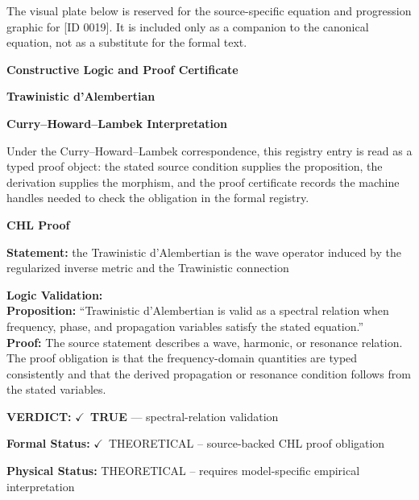 \begingroup\footnotesize\sloppy
The visual plate below is reserved for the source-specific equation and progression graphic for [ID 0019]. It is included only as a companion to the canonical equation, not as a substitute for the formal text.
\par\endgroup
\ifTZPDarkEdition
{}
\fi

\clearpage
\begingroup\tzpsupportsetup
\noindent\textbf{\fontsize{10.8pt}{12.8pt}\selectfont [ID 0019] Constructive Logic and Proof Certificate}\par
\noindent\textbf{\fontsize{10pt}{12pt}\selectfont Trawinistic d'Alembertian}\par
\vspace{0.45em}
\begingroup
\footnotesize
\setlength{\parskip}{0.22em}
\setlength{\parindent}{0pt}
\noindent\textbf{Curry--Howard--Lambek Interpretation}\par
Under the Curry--Howard--Lambek correspondence, this registry entry is read as a typed proof
object: the stated source condition supplies the proposition, the derivation supplies the
morphism, and the proof certificate records the machine handles needed to check the obligation
in the formal registry.

\vspace{0.45em}
\noindent\textbf{CHL Proof}\par
\textbf{Statement:} the Trawinistic d'Alembertian is the wave operator induced by the regularized inverse
metric and the Trawinistic connection

\textbf{Logic Validation:}\\
\textbf{Proposition:} ``Trawinistic d'Alembertian is valid as a spectral relation when frequency, phase, and
propagation variables satisfy the stated equation.''\\
\textbf{Proof:} The source statement describes a wave, harmonic, or resonance relation. The proof
obligation is that the frequency-domain quantities are typed consistently and that the
derived propagation or resonance condition follows from the stated variables.

\textbf{VERDICT:} \ensuremath{\checkmark}\ \textbf{TRUE} --- spectral-relation validation

\textbf{Formal Status:} \ensuremath{\checkmark}\ THEORETICAL -- source-backed CHL proof obligation

\textbf{Physical Status:} THEORETICAL -- requires model-specific empirical interpretation
\par\vspace{0.45em}
\par
\ifTZPDarkEdition
{}
\fi
\endgroup
\endgroup
